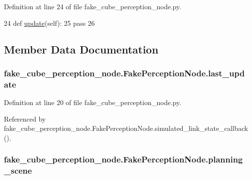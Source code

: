 Definition at line 24 of file fake\+\_\+cube\+\_\+perception\+\_\+node.\+py.


\begin{DoxyCode}
24     \textcolor{keyword}{def }\hyperlink{classfake__cube__perception__node_1_1FakePerceptionNode_ae73741e7f84f057cbf109698e70a2515}{update}(self):
25         \textcolor{keywordflow}{pass}
26 
\end{DoxyCode}


\subsection{Member Data Documentation}
\subsubsection[{\texorpdfstring{last\+\_\+update}{last_update}}]{\setlength{\rightskip}{0pt plus 5cm}fake\+\_\+cube\+\_\+perception\+\_\+node.\+Fake\+Perception\+Node.\+last\+\_\+update}\hypertarget{classfake__cube__perception__node_1_1FakePerceptionNode_a2f5f0b4e0a1483187b2a84552df7edc1}{}\label{classfake__cube__perception__node_1_1FakePerceptionNode_a2f5f0b4e0a1483187b2a84552df7edc1}


Definition at line 20 of file fake\+\_\+cube\+\_\+perception\+\_\+node.\+py.



Referenced by fake\+\_\+cube\+\_\+perception\+\_\+node.\+Fake\+Perception\+Node.\+simulated\+\_\+link\+\_\+state\+\_\+callback().

\subsubsection[{\texorpdfstring{planning\+\_\+scene}{planning_scene}}]{\setlength{\rightskip}{0pt plus 5cm}fake\+\_\+cube\+\_\+perception\+\_\+node.\+Fake\+Perception\+Node.\+planning\+\_\+scene}\hypertarget{classfake__cube__perception__node_1_1FakePerceptionNode_a9385fd4c339eeaf1ca269ef9e314bb09}{}\label{classfake__cube__perception__node_1_1FakePerceptionNode_a9385fd4c339eeaf1ca269ef9e314bb09}


